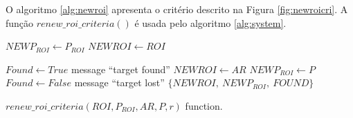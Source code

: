 O algoritmo \ref{alg:newroi} apresenta o critério descrito na Figura \ref{fig:newroicri}.
A função $renew\_roi\_criteria()$ é usada pelo algoritmo \ref{alg:system}.
\begin{algorithm}

    $NEWP_{ROI} \leftarrow  P_{ROI}$ \;
    $NEWROI \leftarrow  ROI$ \;
    
    {
      $Found \leftarrow True$\;
        message ``target found''\;
        {
            $NEWROI \leftarrow  AR$\;
            $NEWP_{ROI} \leftarrow  P$\;
        }
    }
    {
      $Found \leftarrow False$\;
      message ``target lost''\;
    }
\Return  $\{NEWROI,~NEWP_{ROI},~FOUND\}$\;
\label{alg:newroi}
\caption{$renew\_roi\_criteria(ROI,P_{ROI},AR,P,r)$ function.}
\end{algorithm}
